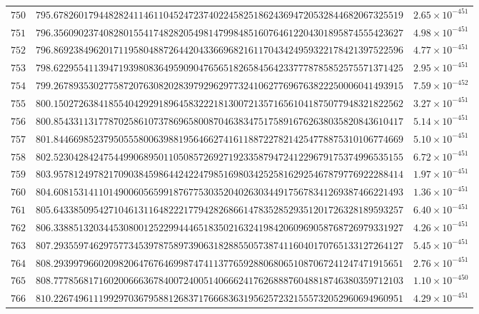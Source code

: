 \documentclass[12pt,reqno]{amsart}
\theoremstyle{remark}
\begin{document}
\begin{longtable}{clc}
$750$ & $795.6782601794482824114611045247237402245825186243694720532844682067325519$ & $2.65\times 10^{-451}$ \\
$751$ & $796.3560902374082801554174828205498147998485160764612204301895874555423627$ & $4.98\times 10^{-451}$ \\
$752$ & $796.8692384962017119580488726442043366968216117043424959322178421397522596$ & $4.77\times 10^{-451}$ \\
$753$ & $798.6229554113947193980836495909047656518265845642337778785852575571371425$ & $2.95\times 10^{-451}$ \\
$754$ & $799.2678935302775872076308202839792962977324106277696763822250006041493915$ & $7.59\times 10^{-452}$ \\
$755$ & $800.1502726384185540429291896458322218130072135716561041875077948321822562$ & $3.27\times 10^{-451}$ \\
$756$ & $800.8543311317787025861073786965800870463834751758916762638035820843610417$ & $5.14\times 10^{-451}$ \\
$757$ & $801.8446698523795055580063988195646627416118872278214254778875310106774669$ & $5.10\times 10^{-451}$ \\
$758$ & $802.5230428424754499068950110508572692719233587947241229679175374996535155$ & $6.72\times 10^{-451}$ \\
$759$ & $803.9578124978217090384598644242247985169803425258162925467879776922288414$ & $1.97\times 10^{-451}$ \\
$760$ & $804.6081531411014900605659918767753035204026303449175678341269387466221493$ & $1.36\times 10^{-451}$ \\
$761$ & $805.6433850954271046131164822217794282686614783528529351201726328189593257$ & $6.40\times 10^{-451}$ \\
$762$ & $806.3388513203445308001252299444651835021632419842060969058768726979331927$ & $4.26\times 10^{-451}$ \\
$763$ & $807.2935597462975773453978758973906318288550573874116040170765133127264127$ & $5.45\times 10^{-451}$ \\
$764$ & $808.2939979660209820647676469987474113776592880680651087067241247471915651$ & $2.76\times 10^{-451}$ \\
$765$ & $808.7778568171602006663678400724005140666241762688876048818746380359712103$ & $1.10\times 10^{-450}$ \\
$766$ & $810.2267496111992970367958812683717666836319562572321555732052960694960951$ & $4.29\times 10^{-451}$ \\

\end{longtable}
\end{document}
